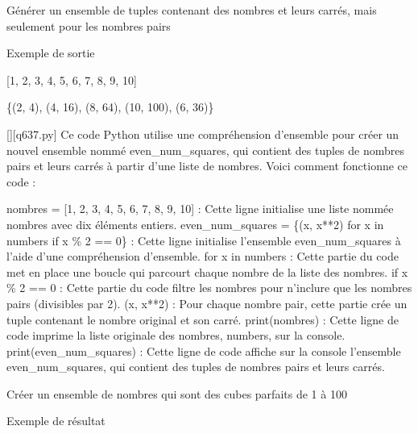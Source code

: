         \question
        Générer un ensemble de tuples contenant des nombres et leurs carrés, mais seulement pour les nombres pairs

Exemple de sortie

[1, 2, 3, 4, 5, 6, 7, 8, 9, 10]

\{(2, 4), (4, 16), (8, 64), (10, 100), (6, 36)\}
        \par
        \begin{solution}
            \renewcommand{\nomfichier}{q637.py}
            \pythonfile{\chemincode \nomfichier}[][\nomfichier]
            Ce code Python utilise une compréhension d'ensemble pour créer un nouvel ensemble nommé even\_num\_squares, qui contient des tuples de nombres pairs et leurs carrés à partir d'une liste de nombres. Voici comment fonctionne ce code :

    nombres = [1, 2, 3, 4, 5, 6, 7, 8, 9, 10] : Cette ligne initialise une liste nommée nombres avec dix éléments entiers.
    even\_num\_squares = \{(x, x**2) for x in numbers if x \% 2 == 0\} : Cette ligne initialise l'ensemble even\_num\_squares à l'aide d'une compréhension d'ensemble.
        for x in numbers : Cette partie du code met en place une boucle qui parcourt chaque nombre de la liste des nombres.
        if x \% 2 == 0 : Cette partie du code filtre les nombres pour n'inclure que les nombres pairs (divisibles par 2).
        (x, x**2) : Pour chaque nombre pair, cette partie crée un tuple contenant le nombre original et son carré.
    print(nombres) : Cette ligne de code imprime la liste originale des nombres, numbers, sur la console.
    print(even\_num\_squares) : Cette ligne de code affiche sur la console l'ensemble even\_num\_squares, qui contient des tuples de nombres pairs et leurs carrés.
        \end{solution}
        

        \question
        Créer un ensemble de nombres qui sont des cubes parfaits de 1 à 100

Exemple de résultat

